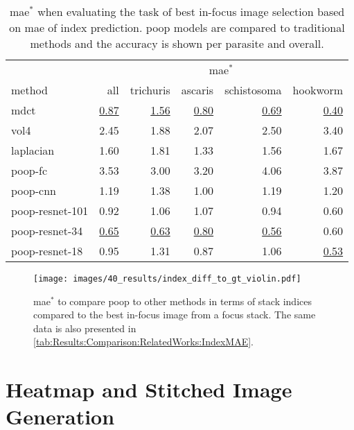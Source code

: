 \begin{table}
    \centering
    \caption[In-focus selection \ac{mae}$^*$]{\ac{mae}$^*$ when evaluating the task of best in-focus image selection based on \ac{mae} of index prediction. \Acs{poop} models are compared to traditional methods and the accuracy is shown per parasite and overall.}
    \begin{tabular}{lrrrrr}
        \hline
        \multicolumn{1}{c}{} & \multicolumn{5}{c}{\ac{mae}$^*$} \\
        \cline{2-6}
        method & all & trichuris & ascaris & schistosoma & hookworm \\
        \hline
        \acs{mdct}      & \underline{0.87} & \underline{1.56} & \underline{0.80} & \underline{0.69} & \underline{0.40} \\
        \acs{vol4}      & 2.45 & 1.88 & 2.07 & 2.50 & 3.40 \\
        \acs{laplacian} & 1.60 & 1.81 & 1.33 & 1.56 & 1.67 \\
        \hline
        \acs{poop}-\acs{fc}              & 3.53 & 3.00 & 3.20 & 4.06 & 3.87 \\
        \acs{poop}-\acs{cnn}             & 1.19 & 1.38 & 1.00 & 1.19 & 1.20 \\
        \acs{poop}-\acs{resnet}-101      & 0.92 & 1.06 & 1.07 & 0.94 & 0.60 \\
        \acs{poop}-\acs{resnet}-34       & \underline{0.65} & \underline{0.63} & \underline{0.80} & \underline{0.56} & 0.60 \\
        \acs{poop}-\acs{resnet}-18       & 0.95 & 1.31 & 0.87 & 1.06 & \underline{0.53} \\
    \end{tabular}
    \label{tab:Results:Comparison:RelatedWorks:IndexMAE}
\end{table}

\begin{figure}
    \centering
    \texttt{[image: images/40\_results/index\_diff\_to\_gt\_violin.pdf]}
    \caption[In-focus selection \ac{mae}$^*$]{\ac{mae}$^*$ to compare \acs{poop} to other methods in terms of stack indices compared to the best in-focus image from a focus stack. The same data is also presented in \autoref{tab:Results:Comparison:RelatedWorks:IndexMAE}.}
    \label{fig:Results:Comparison:RelatedWorks:IndexMAE}
\end{figure}

\FloatBarrier

\section{Heatmap and Stitched Image Generation}
\label{sec:Results:HeatStiched}

